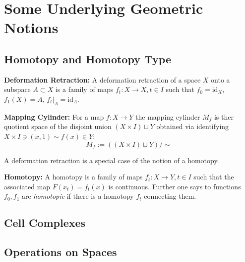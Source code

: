 \documentclass[11pt, a4paper]{article}
\title{\notestitle}
\author{\notesauthor}
\date{\notesdate}
\begin{document}
\maketitle
\tableofcontents
\newpage

\section{Some Underlying Geometric Notions}

\subsection{Homotopy and Homotopy Type}
\begin{definition}
  \textbf{Deformation Retraction: }A deformation retraction of a space $X$ onto a subspace $A\subset X$ is a family of maps $f_t: X\to X, t\in I$ such that $f_0 = \text{id}_X$, $f_1(X) = A$, $f_t|_A = \text{id}_A$.  
\end{definition}

\begin{definition}
  \textbf{Mapping Cylinder: }For a map $f: X\to Y$ the mapping cylinder $M_f$ is ther quotient space of the disjoint union $(X\times I)\sqcup Y$ obtained via identifying $X\times I \ni (x,1) \sim f(x) \in Y$:
  \[M_f:= \left((X\times I)\sqcup Y\right) / \sim\]
\end{definition}

A deformation retraction is a special case of the notion of a homotopy. 

\begin{definition}
  \textbf{Homotopy: }A homotopy is a family of maps $f_t: X\to Y, t\in I$ such that the associated map $F(x_t) = f_t(x)$ is continuous. Further one says to functions $f_0, f_1$ are \textit{homotopic} if there is a homotopy $f_t$ connecting them.
\end{definition}

\subsection{Cell Complexes}

\subsection{Operations on Spaces}
\end{document}
